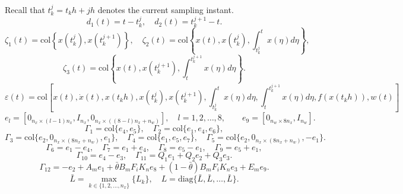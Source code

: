 \documentclass[preprint,review,fleqn,sort&compress,3p]{elsarticle}
\theoremstyle{definition} %
\theoremstyle{definition}%
\newif\ifreviewmarkup
\DeclareRobustCommand{\revdel}[1]{\ifreviewmarkup{\color{revisionred}\hypersetup{linkcolor=revisionred,citecolor=revisionred}#1}\fi}
\DeclareRobustCommand{\revadd}[1]{{\ifreviewmarkup\color{revisiongreen}\hypersetup{linkcolor=revisiongreen,citecolor=revisiongreen}\fi#1}}
\begin{document}
\label{rev:M28}Recall that $t_k^j=t_k h+jh$ denotes the current sampling instant. \revdel{For compact representation, the following notations are introduced:}
\begin{equation*}
	d_1(t) = t - t^j_k, \quad  
	d_2(t) = t^{j+1}_{k} - t.
\end{equation*}
\begin{equation*}
	\zeta_1(t) = \mathrm{col} \left\{ x(t^j_k),  x(t^{j+1}_{k}) \right\}, \quad
	\zeta_2(t) = \mathrm{col} \left\{ x(t), x(t_k^j), \int_{t_k^j}^t x(\eta) d\eta \right\},
\end{equation*}
\begin{equation*}
	\zeta_3(t) = \mathrm{col} \left\{ x(t), x(t_k^{j+1}), \int_t^{t_k^{j+1}} x(\eta) d\eta \right\}.
\end{equation*}
\begin{equation*}
	\varepsilon(t) = \mathrm{col}\left[
	x(t),   \dot{x}(t),   x(t_k h),
	x(t_k^j),   x(t^{j+1}_k),
	\int_{t_k^j}^{t} x(\eta) d\eta,
	\int_{t}^{t_k^{j+1}} x(\eta) d\eta,
	f(x(t_k h)),  w(t)
	\right]
\end{equation*}
\begin{equation*}
	e_l = \left[ 0_{n_x \times (l-1)n_x}, I_{n_x}, 0_{n_x \times ((8-l)n_x+n_w)} \right],\quad l = 1,2,\dots,8,\qquad e_9 = \left[ 0_{n_w \times 8n_x}, I_{n_w} \right].
\end{equation*}
\begin{equation*}
	\Gamma_{1}=\mathrm{col}\{e_{4},e_{5}\},\quad
	\Gamma_{2}=\mathrm{col}\{e_{1},e_{4},e_{6}\},
\end{equation*}
\begin{equation*}
	\Gamma_{3}=\mathrm{col}\{e_{2},0_{n_x\times (8n_x+n_w)},e_{1}\},\quad
	\Gamma_{4}=\mathrm{col}\{e_{1},e_{5},e_{7}\},\quad
	\Gamma_{5}=\mathrm{col}\{e_{2},0_{n_x\times (8n_x+n_w)},-e_{1}\}.
\end{equation*}
\begin{equation*}
	\Gamma_{6}=e_{1} - e_{4},\quad
	\Gamma_{7}=e_{1} + e_{4},\quad
	\Gamma_{8}=e_{5} - e_{1},\quad
	\Gamma_{9}=e_{5} + e_{1},
\end{equation*}
\begin{equation*}
	\Gamma_{10}=e_{4} - e_{3},
	\quad
	\Gamma_{11}=Q_1e_{1}+Q_2e_{2}+Q_3e_{3}.
\end{equation*}
\begin{equation*}
	\Gamma_{12}= 
	-e_{2} + A_me_{1} 
	+ \bar{\theta} B_{m} F_{i} K_{n} e_{8}
	+(1-\bar{\theta})B_{m} F_{i} K_{n} e_{3}
	+E_m e_{9}.
\end{equation*}
\begin{equation*}
	\bar{L}= \max_{k \in \{1,2,\ldots,n_x\}} \{L_k\},
	\quad
	L = \mathrm{diag}\{\bar{L}, \bar{L}, \dots, \bar{L}\}.
\end{equation*}
\end{document}
